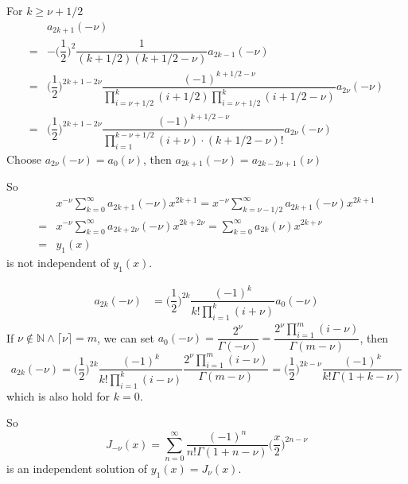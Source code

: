 \documentclass{beamer}
\begin{document}
\begin{frame}
For $k\geqslant\nu+1/2$
\begin{align*}
&a_{2k+1}(-\nu)\\
=&-\Big(\dfrac{1}{2}\Big)^2\dfrac{1}{(k+1/2)(k+1/2-\nu)}a_{2k-1}(-\nu)\\
=&\Big(\dfrac{1}{2}\Big)^{2k+1-2\nu}\dfrac{(-1)^{k+1/2-\nu}}{\prod\limits_{i=\nu+1/2}^{k}(i+1/2)\prod\limits_{i=\nu+1/2}^k(i+1/2-\nu)}a_{2\nu}(-\nu)\\
=&\Big(\dfrac{1}{2}\Big)^{2k+1-2\nu}\dfrac{(-1)^{k+1/2-\nu}}{\prod\limits_{i=1}^{k-\nu+1/2}(i+\nu)\cdot(k+1/2-\nu)!}a_{2\nu}(-\nu)
\end{align*}
Choose $a_{2\nu}(-\nu)=a_{0}(\nu)$, then $a_{2k+1}(-\nu)=a_{2k-2\nu+1}(\nu)$
\end{frame}
\begin{frame}
So
\begin{align*}
&x^{-\nu}\sum\limits_{k=0}^{\infty}a_{2k+1}(-\nu)x^{2k+1}=x^{-\nu}\sum\limits_{k=\nu-1/2}^{\infty}a_{2k+1}(-\nu)x^{2k+1}\\
=&x^{-\nu}\sum\limits_{k=0}^{\infty}a_{2k+2\nu}(-\nu)x^{2k+2\nu}=\sum\limits_{k=0}^{\infty}a_{2k}(\nu)x^{2k+\nu}\\
=&y_1(x)
\end{align*}
is not independent of $y_1(x)$.

\end{frame}

\begin{frame}
\begin{align*}
a_{2k}(-\nu)&=\Big(\dfrac{1}{2}\Big)^{2k}\dfrac{(-1)^k}{k!\prod\limits_{i=1}^k(i+\nu)}a_0(-\nu)
\end{align*}
If $\nu\notin\mathbb{N}\wedge\lceil\nu\rceil=m$,  we can set $a_0(-\nu)=\dfrac{2^{\nu}}{\Gamma(-\nu)}=\dfrac{2^{\nu}\prod\limits_{i=1}^{m}(i-\nu)}{\Gamma(m-\nu)}$, then $$a_{2k}(-\nu)=\Big(\dfrac{1}{2}\Big)^{2k}\dfrac{(-1)^k}{k!\prod\limits_{i=1}^k(i-\nu)}\dfrac{2^{\nu}\prod\limits_{i=1}^{m}(i-\nu)}{\Gamma(m-\nu)}=\Big(\dfrac{1}{2}\Big)^{2k-\nu}\dfrac{(-1)^k}{k!\Gamma(1+k-\nu)}$$
which is also hold for $k=0$.
\end{frame}
\begin{frame}
So
$$J_{-\nu}(x)=\sum\limits_{n=0}^{\infty}\dfrac{(-1)^n}{n!\Gamma(1+n-\nu)}\Big(\dfrac{x}{2}\Big)^{2n-\nu}$$
is an independent solution of $y_1(x)=J_{\nu}(x)$.
\end{frame}
\end{document}
